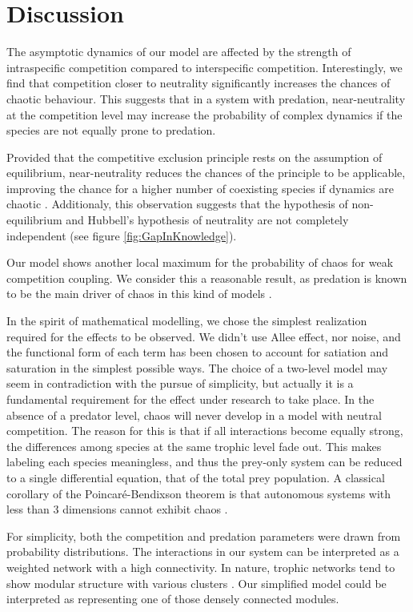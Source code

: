 \section{Discussion}
\label{sec:Discussion}
The asymptotic dynamics of our model are affected by the strength of intraspecific competition compared to interspecific competition. Interestingly, we find that competition closer to neutrality significantly increases the chances of chaotic behaviour. This suggests that in a system with predation, near-neutrality at the competition level may increase the probability of complex dynamics if the species are not equally prone to predation. 

Provided that the competitive exclusion principle rests on the assumption of equilibrium, near-neutrality reduces the chances of the principle to be applicable, improving the chance for a higher number of coexisting species if dynamics are chaotic  \citep{Huisman1999}. Additionaly, this observation suggests that the hypothesis of non-equilibrium and Hubbell's hypothesis of neutrality are not completely independent (see figure \ref{fig:GapInKnowledge}). 

Our model shows another local maximum for the probability of chaos for weak competition coupling. We consider this a reasonable result, as predation is known to be the main driver of chaos in this kind of models \citep{Scheffer2004}.

In the spirit of mathematical modelling, we chose the simplest realization required for the effects to be observed. We didn't use Allee effect, nor noise, and the functional form of each term has been chosen to account for satiation and saturation in the simplest possible ways. The choice of a two-level model may seem in contradiction with the pursue of simplicity, but actually it is a fundamental requirement for the effect under research to take place. In the absence of a predator level, chaos will never develop in a model with neutral competition. The reason for this is that if all interactions become equally strong, the differences among species at the same trophic level fade out. This makes labeling each species meaningless, and thus the prey-only system can be reduced to a single differential equation, that of the total prey population. A classical corollary of the Poincaré-Bendixson theorem is that autonomous systems with less than $3$ dimensions cannot exhibit chaos \citep{Strogatz1994}.

For simplicity, both the competition and predation parameters were drawn from probability distributions. The interactions in our system can be interpreted as a weighted network with a high connectivity. In nature, trophic networks tend to show modular structure with various clusters \citep{Thebault2010}. Our simplified model could be interpreted as representing one of those densely connected modules.

